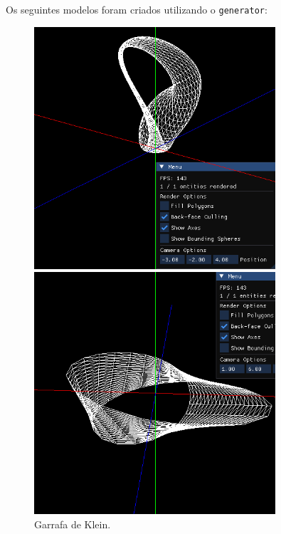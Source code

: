 \documentclass[12pt, a4paper]{article}
\begin{document}
Os seguintes modelos foram criados utilizando o \texttt{generator}:

\begin{figure}[H]
    \centering
    \begin{minipage}{0.32\textwidth}
        \centering
        \includegraphics[width=0.8\textwidth]{res/phase2/results/KleinBottle.png}
        \caption{Garrafa de Klein.}
    \end{minipage}
    \begin{minipage}{0.32\textwidth}
        \centering
        \includegraphics[width=0.8\textwidth]{res/phase2/results/MobiusStrip.png}

\end{minipage}
\end{figure}
\end{document}
